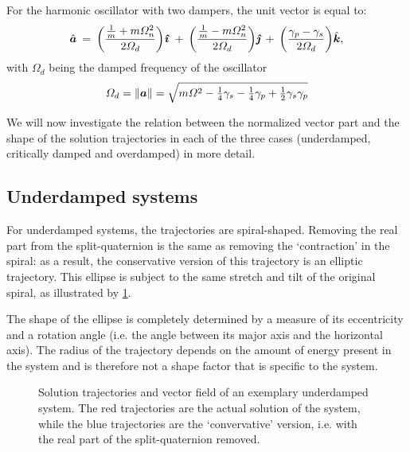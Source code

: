 For the harmonic oscillator with two dampers, the unit vector is equal to:
$$ \uvec{a} \:= \:\qty(\frac{\tfrac{1}{m} + m\Omega_n^2}{2\Omega_d})\quati \: + \:\qty(\frac{\tfrac{1}{m} - m\Omega_n^2}{2\Omega_d})\quatj \:+ \:\qty(\frac{\gamma_p - \gamma_s}{2\Omega_d})\quatk,$$
with $\Omega_d$ being the damped frequency of the oscillator
$$ \Omega_d = \norm{\vec{a}} = \sqrt{m\Omega^2 - \tfrac{1}{4}\gamma_s - \tfrac{1}{4}\gamma_p + \tfrac{1}{2}\gamma_s \gamma_p} $$

We will now investigate the relation between the normalized vector part and the shape of the solution trajectories in each of the three cases (underdamped, critically damped and overdamped) in more detail.

\subsection{Underdamped systems}
For underdamped systems, the trajectories are spiral-shaped. Removing the real part from the split-quaternion is the same as removing the `contraction' in the spiral: as a result, the conservative version of this trajectory is an elliptic trajectory. This ellipse is subject to the same stretch and tilt of the original spiral, as illustrated by \cref{fig:underdamped}. 

The shape of the ellipse is completely determined by a measure of its eccentricity and a rotation angle (i.e. the angle between its major axis and the horizontal axis). The radius of the trajectory depends on the amount of energy present in the system and is therefore not a shape factor that is specific to the system.

\begin{figure}[ht!]
    \centering
    
    \caption{Solution trajectories and vector field of an exemplary underdamped system. The red trajectories are the actual solution of the system, while the blue trajectories are the `convervative' version, i.e. with the real part of the split-quaternion removed.}
    \label{fig:underdamped}
\end{figure}


